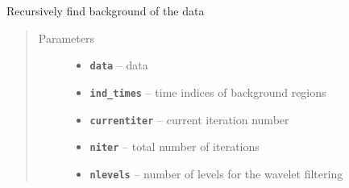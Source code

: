 \documentclass[letterpaper,10pt,english]{sphinxmanual}
\begin{document}
\begin{fulllineitems}
\label{wv_get_background:wv_get_background.recursive_wv}
Recursively find background of the data
\begin{quote}\begin{description}
\item[{Parameters}] \leavevmode\begin{itemize}
\item {} 
\textbf{\texttt{data}} -- data

\item {} 
\textbf{\texttt{ind\_times}} -- time indices of background regions

\item {} 
\textbf{\texttt{currentiter}} -- current iteration number

\item {} 
\textbf{\texttt{niter}} -- total number of iterations

\item {} 
\textbf{\texttt{nlevels}} -- number of levels for the wavelet filtering

\end{itemize}

\end{description}\end{quote}

\end{fulllineitems}

\end{document}
